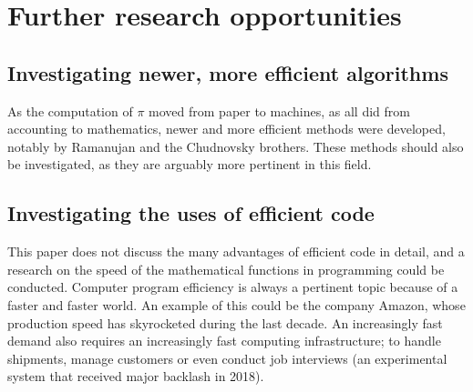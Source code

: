 \section{Further research opportunities}

\subsection{Investigating newer, more efficient algorithms}

As the computation of $\pi$ moved from paper to machines, as all did from accounting to
mathematics, newer and more efficient methods were developed, notably by Ramanujan and
the Chudnovsky brothers. These methods should also be investigated, as they 
are arguably more pertinent in this field. 

\subsection{Investigating the uses of efficient code}

This paper does not discuss the many advantages of efficient code in detail, 
and a research on the speed of the mathematical functions in programming could 
be conducted. Computer program efficiency is always a pertinent topic because 
of a faster and faster world. An example of this could be the company Amazon, 
whose production speed has skyrocketed during the last decade. An increasingly 
fast demand also requires an increasingly fast computing infrastructure; to handle 
shipments, manage customers or even conduct job interviews (an experimental system that received 
major backlash in 2018). \cite{murad_2021}